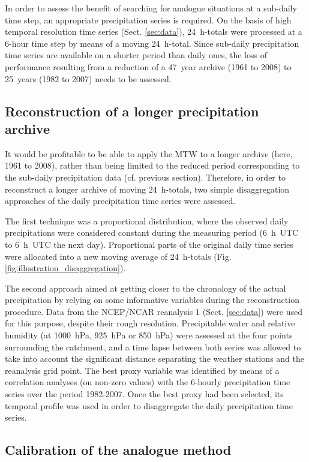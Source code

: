 \documentclass[hess, manuscript]{copernicus}
\begin{document}
	In order to assess the benefit of searching for analogue situations at a sub-daily time step, an appropriate precipitation series is required. On the basis of high temporal resolution time series (Sect. \ref{sec:data}), 24~h-totals were processed at a 6-hour time step by means of a moving 24~h-total. Since sub-daily precipitation time series are available on a shorter period than daily ones, the loss of performance resulting from a reduction of a 47~year archive (1961 to 2008) to 25~years (1982 to 2007) needs to be assessed.
	
	
	\subsection{Reconstruction of a longer precipitation archive}
	\label{sec:reconstruction}
	
	It would be profitable to be able to apply the MTW to a longer archive (here, 1961 to 2008), rather than being limited to the reduced period corresponding to the sub-daily precipitation data (cf. previous section). Therefore, in order to reconstruct a longer archive of moving 24~h-totals, two simple disaggregation approaches of the daily precipitation time series were assessed.
	
	The first technique was a proportional distribution, where the observed daily precipitations were considered constant during the measuring period (6~h~UTC to 6~h~UTC the next day). Proportional parts of the original daily time series were allocated into a new moving average of 24~h-totals (Fig. \ref{fig:illustration_disaggregation}). 
	
	The second approach aimed at getting closer to the chronology of the actual precipitation by relying on some informative variables during the reconstruction procedure. Data from the NCEP/NCAR reanalysis 1 (Sect. \ref{sec:data}) were used for this purpose, despite their rough resolution. Precipitable water and relative humidity (at 1000~hPa, 925~hPa or 850~hPa) were assessed at the four points surrounding the catchment, and a time lapse between both series was allowed to take into account the significant distance separating the weather stations and the reanalysis grid point. The best proxy variable was identified by means of a correlation analyses (on non-zero values) with the 6-hourly precipitation time series over the period 1982-2007. Once the best proxy had been selected, its temporal profile was used in order to disaggregate the daily precipitation time series.
	
	
	\subsection{Calibration of the analogue method}
	\label{sec:calibration}
	
\end{document}
